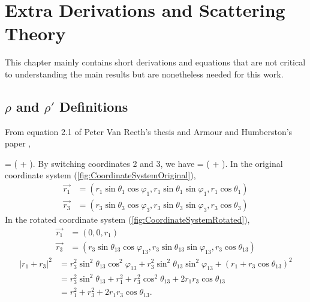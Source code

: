 \documentclass[Dissertation.tex]{subfiles}
\begin{document}
\chapter{Extra Derivations and Scattering Theory}
\label{chp:ExtraDer}

This chapter mainly contains short derivations and equations that are not 
critical to understanding the main results but are nonetheless needed for 
this work.

\section{\texorpdfstring{$\rho$ and $\rho'$} {rho and rho'} Definitions}
\label{sec:RhoDef}
From equation 2.1 of Peter Van Reeth's thesis \cite{VanReethThesis} and Armour and Humberston's paper \cite{Armour1991},

\beq
\vec{\rho} =  \left(  +  \right).
\label{eq:RhoDef1}
\eeq
By switching coordinates 2 and 3, we have
\beq
{} =  \left(  +  \right).
\label{eq:RhoDef2}
\eeq
In the original coordinate system (\cref{fig:CoordinateSystemOriginal}),
\begin{align}
\nonumber \vec{r_1} &= \left( r_1 \sin \theta_1 \cos \varphi_1, r_1 \sin \theta_1 \sin \varphi_1, r_1 \cos \theta_1 \right) \\
\vec{r_3} &= \left( r_3 \sin \theta_3 \cos \varphi_3, r_3 \sin \theta_3 \sin \varphi_3, r_3 \cos \theta_3 \right)
\end{align}
In the rotated coordinate system (\cref{fig:CoordinateSystemRotated}),
\begin{align}
\nonumber \vec{r_1} &= (0, 0, r_1) \\
\vec{r_3} &= \left( r_3 \sin \theta_{13} \cos \varphi_{13}, r_3 \sin \theta_{13} \sin \varphi_{13}, r_3 \cos \theta_{13} \right)
\end{align}
\begin{align}
\nonumber \left| r_1 + r_3 \right|^2 &= r_3^2 \sin^2 \theta_{13} \cos^2 \varphi_{13} + r_3^2 \sin^2 \theta_{13} \sin^2 \varphi_{13} + (r_1 + r_3 \cos \theta_{13})^2\\
\nonumber &= r_3^2 \sin^2 \theta_{13} + r_1^2 + r_3^2 \cos^2 \theta_{13} + 2 r_1 r_3 \cos \theta_{13} \\
&= r_1^2 + r_3^2 + 2 r_1 r_3 \cos \theta_{13}.
\label{eq:RhoDef3}
\end{align}
\end{document}
